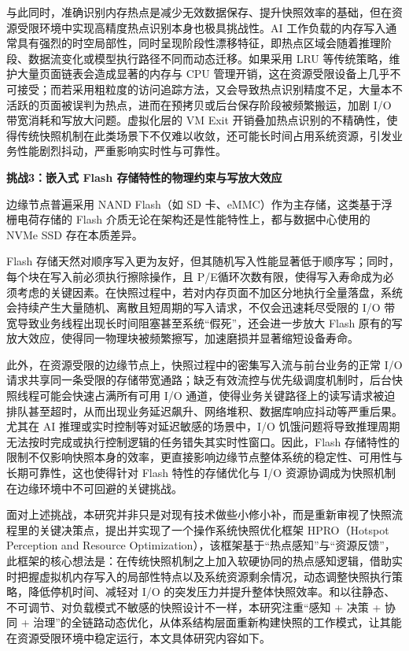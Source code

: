 与此同时，准确识别内存热点是减少无效数据保存、提升快照效率的基础，但在资源受限环境中实现高精度热点识别本身也极具挑战性。AI 工作负载的内存写入通常具有强烈的时空局部性，同时呈现阶段性漂移特征，即热点区域会随着推理阶段、数据流变化或模型执行路径不同而动态迁移\cite{wu2016hot, cui2018snapfiner}。如果采用 LRU 等传统策略，维护大量页面链表会造成显著的内存与 CPU 管理开销，这在资源受限设备上几乎不可接受\cite{wang2014vm}；而若采用粗粒度的访问追踪方法，又会导致热点识别精度不足，大量本不活跃的页面被误判为热点，进而在预拷贝或后台保存阶段被频繁搬运，加剧 I/O 带宽消耗和写放大问题\cite{zhong2016flic}。虚拟化层的 VM Exit 开销叠加热点识别的不精确性，使得传统快照机制在此类场景下不仅难以收敛，还可能长时间占用系统资源，引发业务性能剧烈抖动，严重影响实时性与可靠性。

\textbf{挑战3：嵌入式 Flash 存储特性的物理约束与写放大效应}

边缘节点普遍采用 NAND Flash（如 SD 卡、eMMC）作为主存储，这类基于浮栅电荷存储的 Flash 介质无论在架构还是性能特性上，都与数据中心使用的 NVMe SSD 存在本质差异\cite{aguiar2010embedded}。

Flash 存储天然对顺序写入更为友好，但其随机写入性能显著低于顺序写；同时，每个块在写入前必须执行擦除操作，且 P/E循环次数有限，使得写入寿命成为必须考虑的关键因素。在快照过程中，若对内存页面不加区分地执行全量落盘，系统会持续产生大量随机、离散且短周期的写入请求，不仅会迅速耗尽受限的 I/O 带宽导致业务线程出现长时间阻塞甚至系统“假死”，还会进一步放大 Flash 原有的写放大效应，使得同一物理块被频繁擦写，加速磨损并显著缩短设备寿命\cite{zahed2009reducing}。

此外，在资源受限的边缘节点上，快照过程中的密集写入流与前台业务的正常 I/O 请求共享同一条受限的存储带宽通路；缺乏有效流控与优先级调度机制时，后台快照线程可能会快速占满所有可用 I/O 通道，使得业务关键路径上的读写请求被迫排队甚至超时，从而出现业务延迟飙升、网络堆积、数据库响应抖动等严重后果\cite{shi2019memory, panda2023snapstore}。尤其在 AI 推理或实时控制等对延迟敏感的场景中，I/O 饥饿问题将导致推理周期无法按时完成或执行控制逻辑的任务错失其实时性窗口。因此，Flash 存储特性的限制不仅影响快照本身的效率，更直接影响边缘节点整体系统的稳定性、可用性与长期可靠性，这也使得针对 Flash 特性的存储优化与 I/O 资源协调成为快照机制在边缘环境中不可回避的关键挑战。

面对上述挑战，本研究并非只是对现有技术做些小修小补，而是重新审视了快照流程里的关键决策点，提出并实现了一个操作系统快照优化框架 HPRO（Hotspot Perception and Resource Optimization），该框架基于“热点感知”与“资源反馈”，此框架的核心想法是：在传统快照机制之上加入软硬协同的热点感知逻辑，借助实时把握虚拟机内存写入的局部性特点以及系统资源剩余情况，动态调整快照执行策略，降低停机时间、减轻对 I/O 的突发压力并提升整体快照效率。和以往静态、不可调节、对负载模式不敏感的快照设计不一样，本研究注重“感知 + 决策 + 协同 + 治理”的全链路动态优化，从体系结构层面重新构建快照的工作模式，让其能在资源受限环境中稳定运行，本文具体研究内容如下。

